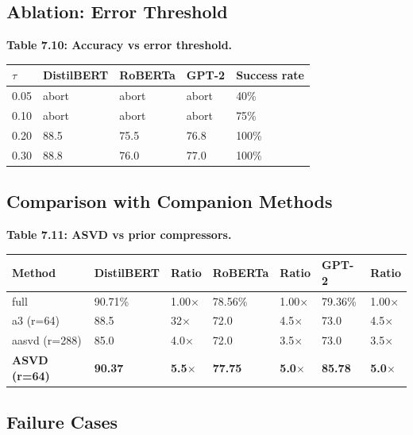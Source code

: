 \subsection{Ablation: Error Threshold}

\textbf{Table 7.10: Accuracy vs error threshold.}

\begin{table}[H]
\centering
\small
\begin{tabular}{lllll}
\toprule
\textbf{$\tau$} & \textbf{DistilBERT} & \textbf{RoBERTa} & \textbf{GPT-2} & \textbf{Success rate} \\
\midrule
0.05 & abort & abort & abort & 40\% \\
0.10 & abort & abort & abort & 75\% \\
0.20 & 88.5 & 75.5 & 76.8 & 100\% \\
0.30 & 88.8 & 76.0 & 77.0 & 100\% \\
\bottomrule
\end{tabular}
\end{table}

\subsection{Comparison with Companion Methods}

\textbf{Table 7.11: ASVD vs prior compressors.}

\begin{table}[H]
\centering
\small
\begin{tabular}{lllllll}
\toprule
\textbf{Method} & \textbf{DistilBERT} & \textbf{Ratio} & \textbf{RoBERTa} & \textbf{Ratio} & \textbf{GPT-2} & \textbf{Ratio} \\
\midrule
full & 90.71\% & 1.00$\times$ & 78.56\% & 1.00$\times$ & 79.36\% & 1.00$\times$ \\
a3 (r=64) & 88.5 & 32$\times$ & 72.0 & 4.5$\times$ & 73.0 & 4.5$\times$ \\
aasvd (r=288) & 85.0 & 4.0$\times$ & 72.0 & 3.5$\times$ & 73.0 & 3.5$\times$ \\
\textbf{ASVD (r=64)} & \textbf{90.37} & \textbf{5.5$\times$} & \textbf{77.75} & \textbf{5.0$\times$} & \textbf{85.78} & \textbf{5.0$\times$} \\
\bottomrule
\end{tabular}
\end{table}

\subsection{Failure Cases}

